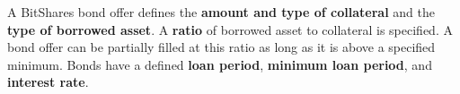 A BitShares bond offer defines the \textbf{amount and type of collateral} and
the \textbf{type of borrowed asset}. A \textbf{ratio} of borrowed asset to
collateral is specified. A bond offer can be partially filled at this ratio as
long as it is above a specified minimum. Bonds have a defined \textbf{loan
period}, \textbf{minimum loan period}, and \textbf{interest rate}.
